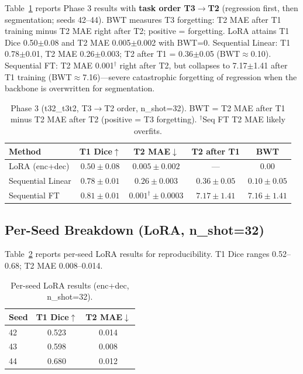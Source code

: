 Table~\ref{tab:t32} reports Phase 3 results with \textbf{task order T3$\to$T2} (regression first, then segmentation; seeds 42--44). BWT measures T3 forgetting: T2 MAE after T1 training minus T2 MAE right after T2; positive = forgetting. LoRA attains T1 Dice 0.50$\pm$0.08 and T2 MAE 0.005$\pm$0.002 with BWT=0. Sequential Linear: T1 0.78$\pm$0.01, T2 MAE 0.26$\pm$0.003; T2 after T1 = 0.36$\pm$0.05 (BWT$\approx$0.10). Sequential FT: T2 MAE 0.001$^\dagger$ right after T2, but collapses to 7.17$\pm$1.41 after T1 training (BWT$\approx$7.16)---severe catastrophic forgetting of regression when the backbone is overwritten for segmentation.

\begin{table}[t]
\caption{Phase 3 (t32\_t3t2, T3$\to$T2 order, n\_shot=32). BWT = T2 MAE after T1 minus T2 MAE after T2 (positive = T3 forgetting). $^\dagger$Seq FT T2 MAE likely overfits.}
\label{tab:t32}
\centering
\begin{tabular}{lcccc}
\toprule
Method & T1 Dice$\uparrow$ & T2 MAE$\downarrow$ & T2 after T1 & BWT \\
\midrule
LoRA (enc+dec) & $0.50 \pm 0.08$ & $0.005 \pm 0.002$ & --- & $\mathbf{0.00}$ \\
Sequential Linear & $0.78 \pm 0.01$ & $0.26 \pm 0.003$ & $0.36 \pm 0.05$ & $0.10 \pm 0.05$ \\
Sequential FT & $0.81 \pm 0.01$ & $0.001^\dagger \pm 0.0003$ & $7.17 \pm 1.41$ & $7.16 \pm 1.41$ \\
\bottomrule
\end{tabular}
\end{table}

\subsection{Per-Seed Breakdown (LoRA, n\_shot=32)}
\label{sec:per_seed}

Table~\ref{tab:per_seed} reports per-seed LoRA results for reproducibility. T1 Dice ranges 0.52--0.68; T2 MAE 0.008--0.014.

\begin{table}[t]
\caption{Per-seed LoRA results (enc+dec, n\_shot=32).}
\label{tab:per_seed}
\centering
\begin{tabular}{lcc}
\toprule
Seed & T1 Dice$\uparrow$ & T2 MAE$\downarrow$ \\
\midrule
42 & 0.523 & 0.014 \\
43 & 0.598 & 0.008 \\
44 & 0.680 & 0.012 \\
\bottomrule
\end{tabular}
\end{table}

